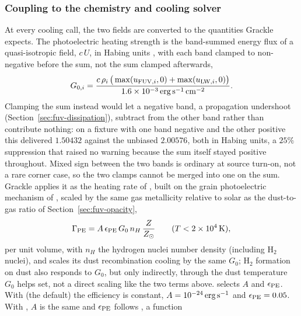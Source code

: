 \subsubsection{Coupling to the chemistry and cooling solver}
\label{sec:fuv-coupling}

At every cooling call, the two fields are converted to the quantities
Grackle expects. The photoelectric heating strength is the band-summed
energy flux of a quasi-isotropic field, $c\,U$, in Habing units
\citep{Habing1968}, with each band clamped to non-negative before the
sum, not the sum clamped afterwards,
\begin{equation}
  G_{0,i} = \frac{c\,\rho_i\,\big(\max(u_{{\rm FUV},i},0) +
                 \max(u_{{\rm LW},i},0)\big)}
                 {1.6\times10^{-3}\,{\rm erg\,s^{-1}\,cm^{-2}}} .
  \label{eq:fuv-g0}
\end{equation}
Clamping the sum instead would let a negative band, a propagation
undershoot (Section~\ref{sec:fuv-dissipation}), subtract from the other
band rather than contribute nothing: on a fixture with one band negative
and the other positive this delivered $1.50432$ against the unbiased
$2.00576$, both in Habing units, a $25\%$ suppression that raised no
warning because the sum itself stayed positive throughout. Mixed sign
between the two bands is ordinary at source turn-on, not a rare corner
case, so the two clamps cannot be merged into one on the sum.
Grackle \citep{Smith2017} applies it as the heating rate of
\citet[their Eq.~1]{Wolfire1995}, built on the grain photoelectric
mechanism of \citet{BakesTielens1994}, scaled by the
same gas metallicity relative to solar as the dust-to-gas ratio of
Section~\ref{sec:fuv-opacity},
\begin{equation}
  \Gamma_{\rm PE} = A\,\epsilon_{\rm PE}\,G_0\,n_H\,
    \frac{Z}{Z_\odot}
  \qquad (T < 2\times10^4\,{\rm K}) ,
  \label{eq:fuv-pe-heating}
\end{equation}
per unit volume, with $n_H$ the hydrogen nuclei number density
(including H$_2$ nuclei), and scales its dust recombination cooling by
the same $G_0$; H$_2$ formation on dust also responds to $G_0$, but only
indirectly, through the dust temperature $G_0$ helps set, not a direct
scaling like the two terms above.
selects $A$ and $\epsilon_{\rm PE}$. With  (the default)
the efficiency is constant, $A = 10^{-24}\,{\rm erg\,s^{-1}}$ and
$\epsilon_{\rm PE} = 0.05$. With , $A$ is the same and
$\epsilon_{\rm PE}$ follows \citet[their Eq.~2]{Wolfire1995}, a function
